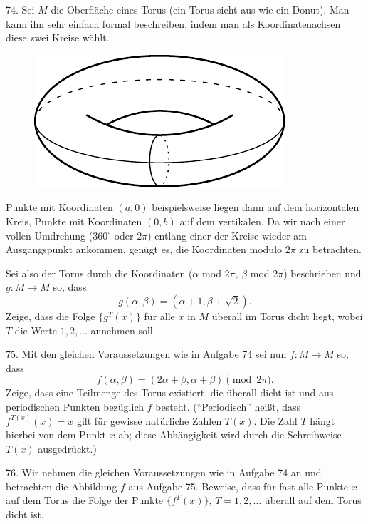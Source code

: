 \begin{problem}{74.}
	Sei $M$ die Oberfläche eines Torus (ein Torus sieht aus wie ein Donut). Man kann ihn sehr einfach formal beschreiben, indem man als Koordinatenachsen diese zwei Kreise wählt.
	\begin{figure}
		\includegraphics{resources/74_torus}
	\end{figure}

	Punkte mit Koordinaten $(a,0)$ beispielsweise liegen dann auf dem horizontalen Kreis, Punkte mit Koordinaten $(0,b)$ auf dem vertikalen.
	Da wir nach einer vollen Umdrehung ($360^\circ$ oder $2\pi$) entlang einer der Kreise wieder am Ausgangspunkt ankommen, genügt es, die Koordinaten modulo $2\pi$ zu betrachten.
	
	Sei also der Torus durch die Koordinaten ($\alpha$ mod $2\pi$, $\beta$ mod $2\pi$) beschrieben und $g: M\to M$ so, dass
	\begin{equation*}
		g(\alpha, \beta)=(\alpha+1, \beta+ \sqrt{2}).
	\end{equation*}
	Zeige, dass die Folge $\{g^T (x)\}$ für alle $x$ in $M$ überall im Torus dicht liegt, wobei $T$ die Werte $1,2,\dots$ annehmen soll.
\end{problem}

\begin{problem}{75.}
	Mit den gleichen Voraussetzungen wie in Aufgabe 74 sei nun $f: M\to M$ so, dass
	\begin{equation*}
		f(\alpha, \beta)=(2\alpha+\beta,\alpha+\beta) \pmod {2\pi}.
	\end{equation*}
	Zeige, dass eine Teilmenge des Torus existiert, die überall dicht ist und aus periodischen Punkten bezüglich $f$ besteht.
	(\enquote{Periodisch} heißt, dass $f^{T (x)} (x)=x$ gilt für gewisse natürliche Zahlen $T(x)$. Die Zahl $T$ hängt hierbei von dem Punkt $x$ ab; diese Abhängigkeit wird durch die Schreibweise $T(x)$ ausgedrückt.)
\end{problem}

\begin{problem}{76.}
	Wir nehmen die gleichen Voraussetzungen wie in Aufgabe 74 an und betrachten die Abbildung $f$ aus Aufgabe 75. Beweise, dass für fast alle Punkte $x$ auf dem Torus die Folge der Punkte $\{f^T (x)\}$, $T=1, 2, \dotsc$ überall auf dem Torus dicht ist.
\end{problem}

